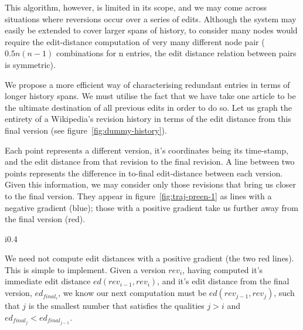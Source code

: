 This algorithm, however, is limited in its scope, and we may come
across situations where reversions occur over a series of
edits. Although the system may easily be extended to cover larger
spans of history, to consider many nodes would require the
edit-distance computation of very many different node pair
($0.5n(n-1)$ combinations for n entries, the edit distance relation
between pairs is symmetric).

We propose a more efficient way of characterising redundant
entries in terms of longer history spans. We must utilise the fact
that we have take one article to be the ultimate destination of all
previous edits in order to do so. Let us graph the entirety of a
Wikipedia's revision history in terms of the edit distance from this
final version (see figure~\ref{fig:dummy-history}).

Each point represents a different version, it's coordinates being its
time-stamp, and the edit distance from that revision to the final
revision. A line between two points represents the difference in
to-final edit-distance between each version. Given this information,
we may consider only those revisions that bring us closer to the final
version. They appear in figure~\ref{fig:traj-preen-1} as lines with a
negative gradient (blue); those with a positive gradient take us
further away from the final version (red).

\begin{wrapfigure}{i}{0.4\textwidth}
  \centering
  \pgfplotsset{width=0.4\textwidth}
  \caption{Graph showing a `trajectory plot'}
  \label{fig:dummy-history}
\end{wrapfigure}

We need not compute edit distances with a positive gradient (the two
red lines). This is simple to implement. Given a version $rev_i$, having
computed it's immediate edit distance $ed(rev_{i-1},rev_i)$, and it's edit
distance from the final version, $ed_{final_i}$, we know our next
computation must be $ed(rev_{j-1},rev_j)$, such that $j$ is the smallest
number that satisfies the qualities $j > i$ and $ed_{final_j} <
ed_{final_{j-1}}$.

